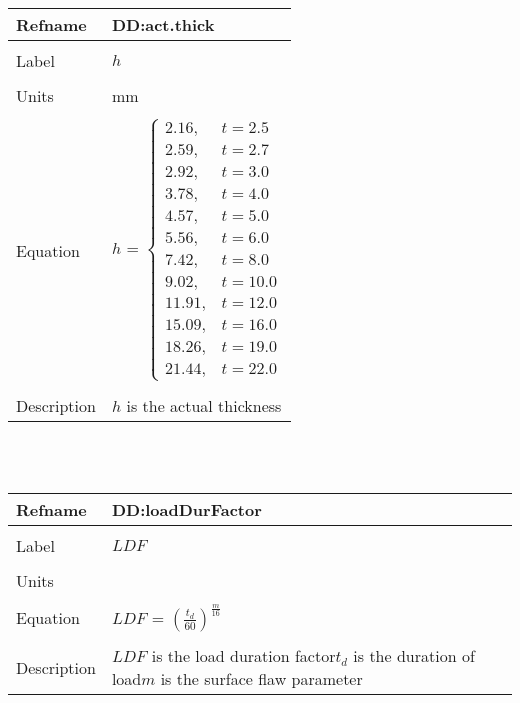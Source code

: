 \documentclass[12pt]{article}
\begin{document}
\noindent \begin{minipage}{\textwidth}
\begin{tabular}{p{} p{}}
\toprule \textbf{Refname} & \textbf{DD:act.thick}
\label{DD:act.thick}
\\ \midrule \\
Label & $h$
\\ \midrule \\
Units & mm
\\ \midrule \\
Equation & $h$ = $\begin{cases}
2.16, & t=2.5\\
2.59, & t=2.7\\
2.92, & t=3.0\\
3.78, & t=4.0\\
4.57, & t=5.0\\
5.56, & t=6.0\\
7.42, & t=8.0\\
9.02, & t=10.0\\
11.91, & t=12.0\\
15.09, & t=16.0\\
18.26, & t=19.0\\
21.44, & t=22.0
\end{cases}$
\\ \midrule \\
Description & $h$ is the actual thickness
\\ \bottomrule \end{tabular}
\end{minipage}\\
~\newline
\noindent \begin{minipage}{\textwidth}
\begin{tabular}{p{} p{}}
\toprule \textbf{Refname} & \textbf{DD:loadDurFactor}
\label{DD:loadDurFactor}
\\ \midrule \\
Label & $LDF$
\\ \midrule \\
Units & 
\\ \midrule \\
Equation & $LDF$ = $\left(\frac{t_{d}}{60}\right)^{\frac{m}{16}}$
\\ \midrule \\
Description & $LDF$ is the load duration factor\newline$t_{d}$ is the duration of load\newline$m$ is the surface flaw parameter
\\ \bottomrule \end{tabular}
\end{minipage}\\
\end{document}
